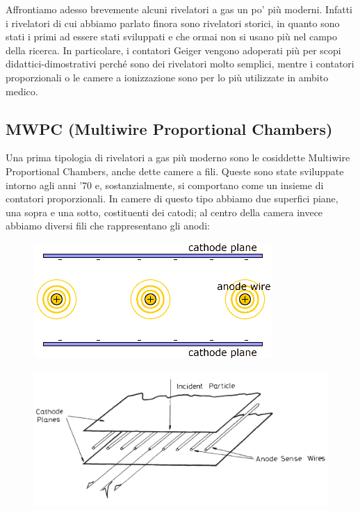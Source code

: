 Affrontiamo adesso brevemente alcuni rivelatori a gas un po' più moderni. Infatti i rivelatori di cui abbiamo parlato finora sono rivelatori storici, in quanto sono stati i primi ad essere stati sviluppati e che ormai non si usano più nel campo della ricerca. In particolare, i contatori Geiger vengono adoperati più per scopi didattici-dimostrativi perché sono dei rivelatori molto semplici, mentre i contatori proporzionali o le camere a ionizzazione sono per lo più utilizzate in ambito medico.

\subsection{MWPC (Multiwire Proportional Chambers)}

Una prima tipologia di rivelatori a gas più moderno sono le cosiddette Multiwire Proportional Chambers, anche dette camere a fili. Queste sono state sviluppate intorno agli anni '70 e, sostanzialmente, si comportano come un insieme di contatori proporzionali. In camere di questo tipo abbiamo due superfici piane, una sopra e una sotto, costituenti dei catodi; al centro della camera invece abbiamo diversi fili che rappresentano gli anodi:

\begin{minipage}{0.49\textwidth}
   \begin{figure}[H]
      \centering
      \includegraphics[width=\textwidth]{immagini/MWPC_1.png}
   \end{figure}
\end{minipage}
\hfill
\begin{minipage}{0.49\textwidth}
   \begin{figure}[H]
      \centering
      \includegraphics[width=\textwidth]{immagini/MWPC_2.png}
   \end{figure}
\end{minipage}

